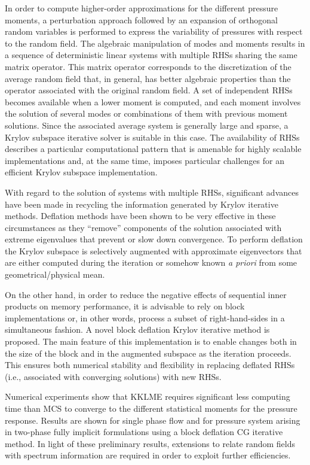 \documentclass{report}
\begin{document}
In order to compute higher-order approximations for the different
pressure moments, a perturbation approach followed by an expansion of
orthogonal random variables is performed to express the variability of
pressures with respect to the random field. The algebraic manipulation of
modes and moments results in a sequence of deterministic linear systems
with multiple RHSs sharing the same matrix operator. This matrix operator
corresponds to the discretization of the average random field that, in
general, has better algebraic properties than the operator associated
with the original random field. A set of independent RHSs becomes
available when a lower moment is computed, and each moment involves the
solution of several modes or combinations of them with previous moment
solutions.
Since the associated average system is generally large and sparse, a
Krylov subspace iterative solver is suitable in this case. The
availability of RHSs describes a particular computational pattern that is
amenable for highly scalable implementations and, at the same time,
imposes particular challenges for an efficient Krylov subspace
implementation.

With regard to the solution of systems with multiple RHSs, significant
advances have been made in recycling the information generated by Krylov
iterative methods. Deflation methods have been shown to be very effective
in these circumstances as they ``remove'' components of the solution
associated with extreme eigenvalues that prevent or slow down
convergence. To perform deflation the Krylov subspace is selectively
augmented with approximate eigenvectors that are either computed during
the iteration or somehow known \emph{a priori} from some
geometrical/physical mean.

On the other hand, in order to reduce the negative effects of sequential
inner products on memory performance, it is advisable to rely on block
implementations or, in other words, process a subset of right-hand-sides
in a simultaneous fashion. A novel block deflation Krylov iterative
method is proposed. The main feature of this implementation is to enable
changes both in the size of the block and in the augmented subspace as
the iteration proceeds. This ensures both numerical stability and
flexibility in replacing deflated RHSs (i.e., associated with converging
solutions) with new RHSs.

Numerical experiments show that KKLME requires significant less computing
time than MCS to converge to the different statistical moments for the
pressure response. Results are shown for single phase flow and for
pressure system arising in two-phase fully implicit formulations using a
block deflation CG iterative method. In light of these preliminary
results, extensions to relate random fields with spectrum information are
required in order to exploit further efficiencies.
\end{document}
